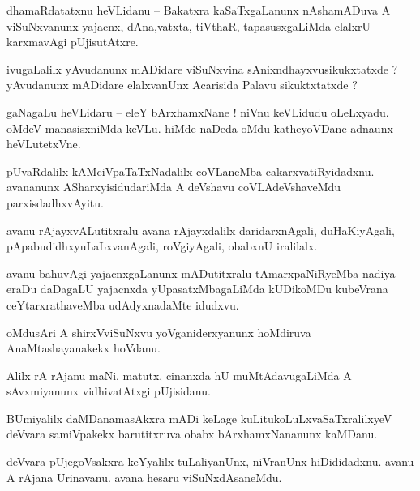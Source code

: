\documentclass{article}
\begin{document}
\begin{mn}%
dhamaRdatatxnu heVLidanu -- Bakatxra kaSaTxgaLanunx nAshamADuva A viSuNxvanunx yajacnx, 
dAna,vatxta, tiVthaR, tapasusxgaLiMda elalxrU karxmavAgi pUjisutAtxre.
\end{mn}

\begin{mn}%
ivugaLalilx yAvudanunx mADidare viSuNxvina sAnixndhayxvusikukxtatxde ? yAvudanunx mADidare 
elalxvanUnx Acarisida Palavu sikuktxtatxde ?
\end{mn}

\begin{mn}%
gaNagaLu heVLidaru -- eleY bArxhamxNane ! niVnu keVLidudu oLeLxyadu. oMdeV manasisxniMda keVLu. 
hiMde naDeda oMdu katheyoVDane adnaunx heVLutetxVne.
\end{mn}

\begin{mn}%
pUvaRdalilx kAMciVpaTaTxNadalilx coVLaneMba cakarxvatiRyidadxnu. avananunx ASharxyisidudariMda A 
deVshavu coVLAdeVshaveMdu parxisdadhxvAyitu.
\end{mn}

\begin{mn}%
avanu rAjayxvALutitxralu avana rAjayxdalilx daridarxnAgali, duHaKiyAgali, 
pApabudidhxyuLaLxvanAgali, roVgiyAgali, obabxnU iralilalx.
\end{mn}

\begin{mn}%
avanu bahuvAgi yajacnxgaLanunx mADutitxralu tAmarxpaNiRyeMba nadiya eraDu daDagaLU yajacnxda 
yUpasatxMbagaLiMda kUDikoMDu kubeVrana ceYtarxrathaveMba udAdyxnadaMte idudxvu.
\end{mn}

\begin{mn}%
oMdusAri A shirxVviSuNxvu yoVganiderxyanunx hoMdiruva AnaMtashayanakekx hoVdanu.
\end{mn}

\begin{mn}%
Alilx rA rAjanu maNi, matutx, cinanxda hU muMtAdavugaLiMda A sAvxmiyanunx vidhivatAtxgi pUjisidanu.
\end{mn}

\begin{mn}%
BUmiyalilx daMDanamasAkxra mADi keLage kuLitukoLuLxvaSaTxralilxyeV deVvara samiVpakekx 
barutitxruva obabx bArxhamxNananunx kaMDanu.
\end{mn}

\begin{mn}%
deVvara pUjegoVsakxra keYyalilx tuLaliyanUnx, niVranUnx hiDididadxnu. avanu A rAjana Urinavanu. 
avana hesaru viSuNxdAsaneMdu.
\end{mn}
\end{document}
